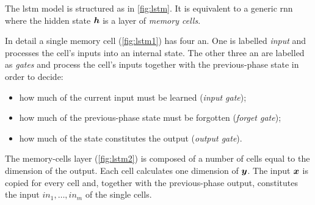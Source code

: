 The \ac{lstm} model is structured as in \cref{fig:lstm}. It is
equivalent to a
generic \ac{rnn} where the hidden state $\bm{h}$ is a
layer of \emph{memory cells}.

In detail a single
memory cell (\cref{fig:lstm1}) has four \acf{an}. One is labelled \emph{input}
and processes the cell's 
inputs into an internal state. The other three \ac{an} are labelled as
\emph{gates} and process the cell's inputs together with the previous-phase
state in order to decide:
\begin{itemize}
\item how much of the current input must be learned
  (\emph{input gate});
\item how much of the previous-phase state must be forgotten
  (\emph{forget gate});
\item how much of the state constitutes the output (\emph{output gate}).
\end{itemize}

The memory-cells layer (\cref{fig:lstm2}) is composed of a number of
cells equal to the dimension of the output. Each cell
calculates one dimension of $\bm{y}$. The input $\bm{x}$ is copied
for every cell and, together with the previous-phase
output,
constitutes the input $in_1,\dots,in_m$ of the single cells.
